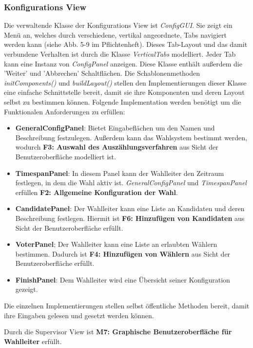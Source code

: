 \documentclass[parskip=full]{scrartcl}
\newcommand{\textitx}[1]{\mbox{\textit{#1}}}
\newcommand{\fakeparagraph}[1]{\textbf{#1}}
\begin{document}
		\subsubsection{Konfigurations View}
		Die verwaltende Klasse der Konfigurations View ist \textitx{ConfigGUI}. Sie zeigt ein Menü an, welches durch verschiedene, vertikal angeordnete, Tabs navigiert werden kann (siehe Abb. 5-9 im Pflichtenheft). Dieses Tab-Layout und das damit verbundene Verhalten ist durch die Klasse \textitx{VerticalTabs} modelliert. Jeder Tab kann eine Instanz von \textitx{ConfigPanel} anzeigen. Diese Klasse enthält außerdem die 'Weiter' und 'Abbrechen' Schaltflächen. Die Schablonenmethoden \textitx{initComponents()} und \textitx{buildLayout()} stellen den Implementierungen dieser Klasse eine einfache Schnittstelle bereit, damit sie ihre Komponenten und deren Layout selbst zu bestimmen können. 
		Folgende Implementation werden benötigt um die Funktionalen Anforderungen zu erfüllen:
		\begin{itemize}
			\item\fakeparagraph{GeneralConfigPanel}: Bietet Eingabeflächen um den Namen und Beschreibung festzulegen. Außerdem kann das Wahlsystem bestimmt werden, wodurch \textbf{F3: Auswahl des Auszählungsverfahren} aus Sicht der Benutzeroberfläche modelliert ist.
			\item\fakeparagraph{TimespanPanel}: In diesem Panel kann der Wahlleiter den Zeitraum festlegen, in dem die Wahl aktiv ist. \textitx{GeneralConfigPanel} und \textitx{TimespanPanel} erfüllen \textbf{F2: Allgemeine Konfiguration der Wahl}.
			\item\fakeparagraph{CandidatePanel}: Der Wahlleiter kann eine Liste an Kandidaten und deren Beschreibung festlegen. Hiermit ist \textbf{F6: Hinzufügen von Kandidaten} aus Sicht der Benutzeroberfläche erfüllt.
			\item\fakeparagraph{VoterPanel}; Der Wahlleiter kann eine Liste an erlaubten Wählern bestimmen. Dadurch ist \textbf{F4: Hinzufügen von Wählern} aus Sicht der Benutzeroberfläche erfüllt.
			\item\fakeparagraph{FinishPanel}: Dem Wahlleiter wird eine Übersicht seiner Konfiguration gezeigt. 
		\end{itemize}
		Die einzelnen Implementierungen stellen selbst öffentliche Methoden bereit, damit ihre Eingaben gelesen und gesetzt werden können.
		
		Durch die Supervisor View ist \textbf{M7: Graphische Benutzeroberfläche für Wahlleiter} erfüllt.
		
\end{document}
